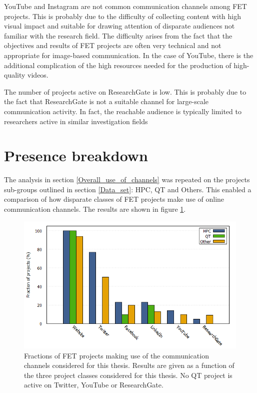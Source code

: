YouTube and Instagram are not common communication channels among FET projects. This is probably due to the difficulty of collecting content with high visual impact and suitable for drawing attention of disparate audiences not familiar with the research field. The difficulty arises from the fact that the objectives and results of FET projects are often very technical and not appropriate for image-based communication. In the case of YouTube, there is the additional complication of the high resources needed for the production of high-quality videos.

The number of projects active on ResearchGate is low. This is probably due to the fact that ResearchGate is not a suitable channel for large-scale communication activity. In fact, the reachable audience is typically limited to researchers active in similar investigation fields

\section{Presence breakdown} \label{Presence_breakdown}
The analysis in section \ref{Overall_use_of_channels} was repeated on the projects sub-groups outlined in section \ref{Data_set}: HPC, QT and Others. This enabled a comparison of how disparate classes of FET projects make use of online communication channels. The results are shown in figure \ref{Social_media_breakdown}. 

\begin{figure}[!t] 
 \begin{center}
 \includegraphics[scale=0.4]{Images/Social_media_breakdown.png}
 \caption{Fractions of FET projects making use of the communication channels considered for this thesis. Results are given as a function of the three project classes considered for this thesis. No QT project is active on Twitter, YouTube or ResearchGate.}
 \label{Social_media_breakdown}
 \end{center}
\end{figure}

